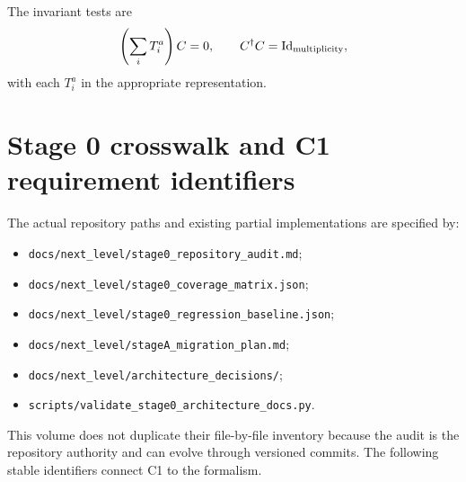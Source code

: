 \documentclass[11pt]{article}
\newcommand{\Id}{\operatorname{Id}}
\begin{document}
The invariant tests are
\begin{equation}
 \left(\sum_i T_i^a\right)C=0,
 \qquad
 C^\dagger C=\Id_{\rm multiplicity},
\label{eq:color-coupler-tests}
\end{equation}
with each \(T_i^a\) in the appropriate representation.

\section{Stage 0 crosswalk and C1 requirement identifiers}
\label{app:c0-crosswalk}

The actual repository paths and existing partial implementations are
specified by:
\begin{itemize}
\item \texttt{docs/next\_level/stage0\_repository\_audit.md};
\item \texttt{docs/next\_level/stage0\_coverage\_matrix.json};
\item \texttt{docs/next\_level/stage0\_regression\_baseline.json};
\item \texttt{docs/next\_level/stageA\_migration\_plan.md};
\item \texttt{docs/next\_level/architecture\_decisions/};
\item \texttt{scripts/validate\_stage0\_architecture\_docs.py}.
\end{itemize}
This volume does not duplicate their file-by-file inventory because the audit
is the repository authority and can evolve through versioned commits.  The
following stable identifiers connect C1 to the formalism.
\end{document}
